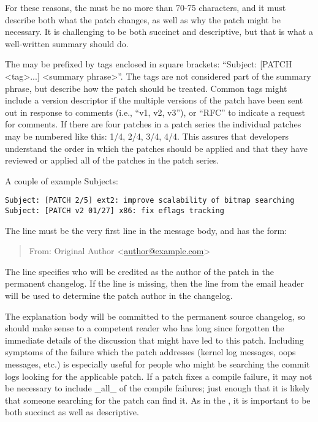 \documentclass[a4paper,8pt,english]{sphinxmanual}
\begin{document}
For these reasons, the  must be no more than 70-75
characters, and it must describe both what the patch changes, as well
as why the patch might be necessary.  It is challenging to be both
succinct and descriptive, but that is what a well-written summary
should do.

The  may be prefixed by tags enclosed in square
brackets: ``Subject: {[}PATCH \textless{}tag\textgreater{}...{]} \textless{}summary phrase\textgreater{}''.  The tags are
not considered part of the summary phrase, but describe how the patch
should be treated.  Common tags might include a version descriptor if
the multiple versions of the patch have been sent out in response to
comments (i.e., ``v1, v2, v3''), or ``RFC'' to indicate a request for
comments.  If there are four patches in a patch series the individual
patches may be numbered like this: 1/4, 2/4, 3/4, 4/4.  This assures
that developers understand the order in which the patches should be
applied and that they have reviewed or applied all of the patches in
the patch series.

A couple of example Subjects:

\begin{Verbatim}[commandchars=\\\{\}]
Subject: [PATCH 2/5] ext2: improve scalability of bitmap searching
Subject: [PATCH v2 01/27] x86: fix eflags tracking
\end{Verbatim}

The  line must be the very first line in the message body,
and has the form:
\begin{quote}

From: Original Author \textless{}\href{mailto:author@example.com}{author@example.com}\textgreater{}
\end{quote}

The  line specifies who will be credited as the author of the
patch in the permanent changelog.  If the  line is missing,
then the  line from the email header will be used to determine
the patch author in the changelog.

The explanation body will be committed to the permanent source
changelog, so should make sense to a competent reader who has long
since forgotten the immediate details of the discussion that might
have led to this patch.  Including symptoms of the failure which the
patch addresses (kernel log messages, oops messages, etc.) is
especially useful for people who might be searching the commit logs
looking for the applicable patch.  If a patch fixes a compile failure,
it may not be necessary to include \_all\_ of the compile failures; just
enough that it is likely that someone searching for the patch can find
it.  As in the , it is important to be both succinct as
well as descriptive.
\end{document}
